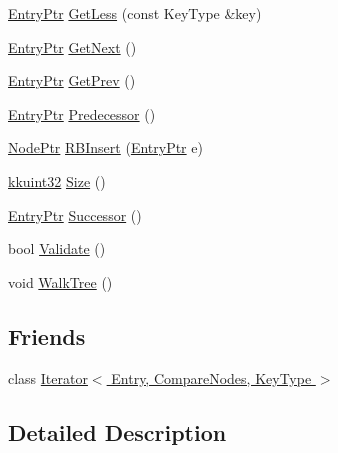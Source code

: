 \begin{DoxyCompactItemize}
\item 
\hyperlink{class_k_k_b_1_1_r_b_tree_a0e7710d8357973338c99b99034b17f33}{Entry\+Ptr} \hyperlink{class_k_k_b_1_1_r_b_tree_a0e2fc0cb7fd4091c8abde407edd84351}{Get\+Less} (const Key\+Type \&key)
\item 
\hyperlink{class_k_k_b_1_1_r_b_tree_a0e7710d8357973338c99b99034b17f33}{Entry\+Ptr} \hyperlink{class_k_k_b_1_1_r_b_tree_a0d2058b081781e20e9f02cee450c6071}{Get\+Next} ()
\item 
\hyperlink{class_k_k_b_1_1_r_b_tree_a0e7710d8357973338c99b99034b17f33}{Entry\+Ptr} \hyperlink{class_k_k_b_1_1_r_b_tree_a288b6e6075de026e66848d181b6acfe7}{Get\+Prev} ()
\item 
\hyperlink{class_k_k_b_1_1_r_b_tree_a0e7710d8357973338c99b99034b17f33}{Entry\+Ptr} \hyperlink{class_k_k_b_1_1_r_b_tree_a3a5c20c3087b62c7a68a48878eb8fe82}{Predecessor} ()
\item 
\hyperlink{class_k_k_b_1_1_r_b_tree_a6b0f3cc33c4554c51afe9bbb82c41906}{Node\+Ptr} \hyperlink{class_k_k_b_1_1_r_b_tree_a210190ae61de6e1a7b15b39673e6a47d}{R\+B\+Insert} (\hyperlink{class_k_k_b_1_1_r_b_tree_a0e7710d8357973338c99b99034b17f33}{Entry\+Ptr} e)
\item 
\hyperlink{namespace_k_k_b_af8d832f05c54994a1cce25bd5743e19a}{kkuint32} \hyperlink{class_k_k_b_1_1_r_b_tree_ae859ee76df89480dae7d99ff1928d294}{Size} ()
\item 
\hyperlink{class_k_k_b_1_1_r_b_tree_a0e7710d8357973338c99b99034b17f33}{Entry\+Ptr} \hyperlink{class_k_k_b_1_1_r_b_tree_ab1d21c68ef6c6a58b0317f9986e66804}{Successor} ()
\item 
bool \hyperlink{class_k_k_b_1_1_r_b_tree_ab18dadc39bc478f028afee14fb4199a5}{Validate} ()
\item 
void \hyperlink{class_k_k_b_1_1_r_b_tree_a5ae41c47b60eda49ebd66754e863258c}{Walk\+Tree} ()
\end{DoxyCompactItemize}
\subsection*{Friends}
\begin{DoxyCompactItemize}
\item 
class \hyperlink{class_k_k_b_1_1_r_b_tree_a6acff2e7675519aa68e26d0e3328ac78}{Iterator$<$ Entry, Compare\+Nodes, Key\+Type $>$}
\end{DoxyCompactItemize}


\subsection{Detailed Description}
